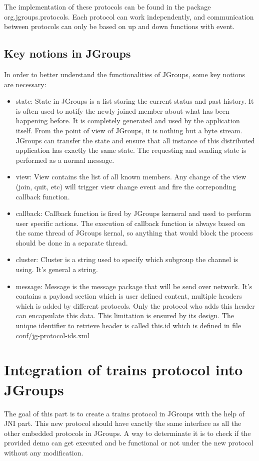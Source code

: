 \documentclass[a4paper,10pt]{report}
\begin{document}
The implementation of these protocols can be found in the package org.jgroups.protocols. Each protocol can work independently, and communication between protocols can only be based on up and down functions with event.

\subsection{Key notions in JGroups}
In order to  better understand the functionalities of JGroups, some key notions are necessary:
\begin{itemize}
\item state: State in JGroups is a list storing the current status and past history. 
It is often used to notify the newly joined member about what has been happening before.
It is completely generated and used by the application itself. 
From the point of view of JGroups, it is nothing but a byte stream. 
JGroups can transfer the state and ensure that all instance of this distributed application has exactly the same state. 
The requesting and sending state is performed as a normal message.
\item view: View contains the list of all known members. Any change of the view (join, quit, etc) will trigger view change event and fire the correponding callback function.
\item callback: Callback function is fired by JGroups kerneral and used to perform user specific actions. The execution of callback function is always based on the same thread of JGroups kernal, so anything that would block the process should be done in a separate thread.
\item cluster: Cluster is a string used to specify which subgroup the channel is using. It's general a string.
\item message: Message is the message package that will be send over network. It's contains a payload section which is user defined content, multiple headers which is added by different protocols. Only the protocol who adds this header can encapsulate this data. This limitation is ensured by its design. The unique identifier to retrieve header is called this.id which is defined in file conf/jg-protocol-ids.xml
\end{itemize}

\section{Integration of trains protocol into JGroups}
The goal of this part is to create a trains protocol in JGroups with the help of JNI part.
This new protocol should have exactly the same interface as all the other embedded protocols in JGroups.
A way to determinate it is to check if the provided demo can get executed and be functional or not under the new protocol without any modification.
\end{document}
